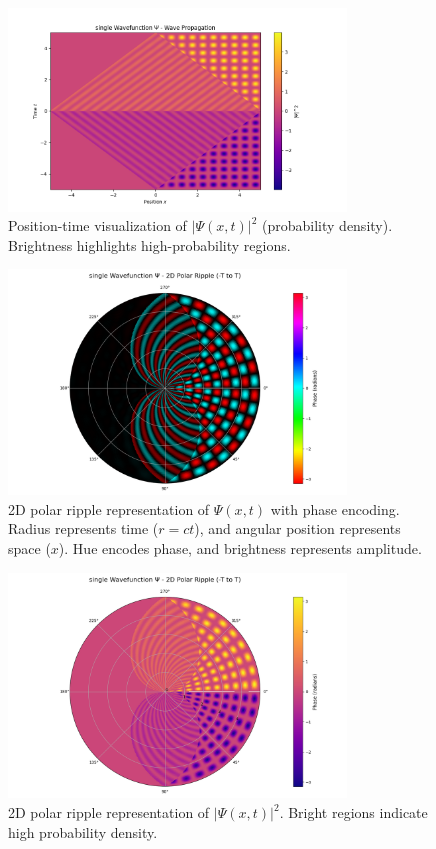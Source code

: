 \documentclass[12pt]{article}
\begin{document}
\begin{figure}[H]
    \centering
    \includegraphics[width=0.8\textwidth]{images/single_wavefunction_probability_density.png}
    \caption{Position-time visualization of \(|\Psi(x,t)|^2\) (probability density). Brightness highlights high-probability regions.}
    \label{fig:single_xt_density}
\end{figure}

\begin{figure}[H]
    \centering
    \includegraphics[width=0.8\textwidth]{images/single_wavefunction_2d_polar_with_phase.png}
    \caption{2D polar ripple representation of \(\Psi(x,t)\) with phase encoding. Radius represents time (\(r = ct\)), and angular position represents space (\(x\)). Hue encodes phase, and brightness represents amplitude.}
    \label{fig:single_2d_polar}
\end{figure}

\begin{figure}[H]
    \centering
    \includegraphics[width=0.8\textwidth]{images/single_wavefunction_2d_polar_probability_density.png}
    \caption{2D polar ripple representation of \(|\Psi(x,t)|^2\). Bright regions indicate high probability density.}
    \label{fig:single_2d_polar_density}
\end{figure}
\end{document}
